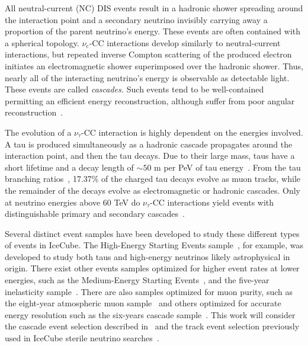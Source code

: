 \documentclass[main.tex]{subfiles}
\begin{document}
All neutral-current (NC) DIS events result in a hadronic shower spreading around the interaction point and a secondary neutrino invisibly carrying away a proportion of the parent neutrino's energy. 
These events are often contained with a spherical topology. 
$\nu_{e}$-CC interactions develop similarly to neutral-current interactions, but repeated inverse Compton scattering of the produced electron initiates an electromagnetic shower superimposed over the hadronic shower. 
Thus, nearly all of the interacting neutrino's energy is observable as detectable light. 
These events are called \textit{cascades.} Such events tend to be well-contained permitting an efficient energy reconstruction, although suffer from poor angular reconstruction~\cite{icecube_energy_reco}. 

The evolution of a $\nu_{\tau}$-CC interaction is highly dependent on the energies involved. A tau is produced simultaneously as a hadronic cascade propagates around the interaction point, and then the tau decays. 
Due to their large mass, taus have a short lifetime and a decay length of $\sim 50$ m per PeV of tau energy~\cite{abbasi2020measurement}. 
From the tau branching ratios~\cite{PhysRevD.98.030001}, 17.37\% of the charged tau decays evolve as muon tracks, while the remainder of the decays evolve as electromagnetic or hadronic cascades. Only at neutrino energies above 60 TeV do $\nu_{\tau}$-CC interactions yield events with distinguishable primary and secondary cascades~\cite{abbasi2020measurement}.

Several distinct event samples have been developed to study these different types of events in IceCube. The High-Energy Starting Events sample~\cite{2021hese}, for example, was developed to study both taus and high-energy neutrinos likely astrophysical in origin. There exist other events samples optimized for higher event rates at lower energies, such as the Medium-Energy Starting Events~\cite{PhysRevDoverone}, and the five-year inelasticity sample~\cite{inelasticity2019}. There are also samples optimized for muon purity, such as the eight-year atmospheric muon sample~\cite{Aartsen_2020_prd} and others optimized for accurate energy resolution such as the six-years cascade sample~\cite{sixyrscascade}. This work will consider the cascade event selection described in~\cite{2018PhDT17N} and the track event selection previously used in IceCube sterile neutrino searches~\cite{PhysRevLett.117.071801}.
\end{document}
